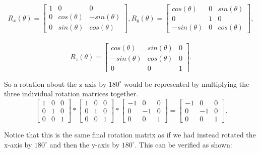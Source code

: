 $$ R_x(\theta) =
\begin{bmatrix}
1	&	0 				& 	0 \\
0 	& 	cos(\theta)	&	-sin(\theta) \\
0 	& 	sin(\theta) 	& 	cos(\theta)
\end{bmatrix},
R_y(\theta) =
\begin{bmatrix}
cos(\theta)		&		0 		& 		sin(\theta) \\
0 				&		1		& 		0 \\
-sin(\theta) 	& 		0 		& 		cos(\theta)

\end{bmatrix},
$$
\\
$$
R_z(\theta) =
\begin{bmatrix}
cos(\theta)		&		sin(\theta) & 		0 \\
-sin(\theta)	&		cos(\theta)	& 		0 \\
0 				& 		0 			& 		1
\end{bmatrix}.
$$

So a rotation about the z-axis by $180^\circ$ would be represented by multiplying the three individual rotation matrices together.
\\
$$
\begin{bmatrix}
1	&	0 	& 	0 \\
0 	& 	1	&	0 \\
0 	& 	0 	& 	1
\end{bmatrix}
*
\begin{bmatrix}
1	&	0 	& 	0 \\
0 	& 	1	&	0 \\
0 	& 	0 	& 	1
\end{bmatrix}
*
\begin{bmatrix}
-1	&	0 	& 	0 \\
0 	& 	-1	&	0 \\
0 	& 	0 	& 	1
\end{bmatrix}
=
\begin{bmatrix}
-1	&	0 	& 	0 \\
0 	& 	-1	&	0 \\
0 	& 	0 	& 	1
\end{bmatrix}. $$

Notice that this is the same final rotation matrix as if we had instead rotated the x-axis by $180^\circ$ and then the y-axis by $180^\circ$.
This can be verified as shown:


